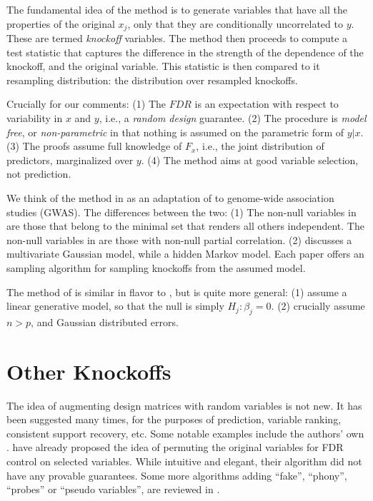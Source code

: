 \documentclass[article,lineno]{biometrika}
\begin{document}
The fundamental idea of the method is to generate variables that have all the properties of the original $x_j$, only that they are conditionally uncorrelated to $y$. 
These are termed \emph{knockoff} variables. 
The method then proceeds to compute a test statistic that captures the difference in the strength of the dependence of the knockoff, and the original variable. 
This statistic is then compared to it resampling distribution: the distribution over resampled knockoffs. 

Crucially for our comments:
(1) The $FDR$ is an expectation with respect to variability in $x$ and $y$, i.e., a \emph{random design} guarantee. 
(2) The procedure is \emph{model free}, or \emph{non-parametric} in that nothing is assumed on the parametric form of $y|x$. 
(3) The proofs assume full knowledge of $F_x$, i.e., the joint distribution of predictors, marginalized over $y$.
(4) The method aims at good variable selection, not prediction. 

We think of the method in \cite{SesiaGenehuntinghidden} as an adaptation of \cite{CandesPanninggoldmodelX2018} to genome-wide association studies (GWAS).
The differences between the two:
(1) The non-null variables in \cite{CandesPanninggoldmodelX2018} are those that belong to the minimal set that renders all others independent. The non-null variables in \cite{SesiaGenehuntinghidden} are those with non-null partial correlation. 
(2) \cite{CandesPanninggoldmodelX2018} discusses a multivariate Gaussian model, while \cite{SesiaGenehuntinghidden} a hidden Markov model. 
Each paper offers an sampling algorithm for sampling knockoffs from the assumed model. 

The method of \cite{SesiaGenehuntinghidden} is similar in flavor to \cite{BarberControllingfalsediscovery2015}, but \cite{SesiaGenehuntinghidden} is quite more general:
(1) \cite{BarberControllingfalsediscovery2015} assume a linear generative model, so that the null is simply $H_j:\beta_j=0$. 
(2) \cite{BarberControllingfalsediscovery2015} crucially assume $n>p$, and Gaussian distributed errors. 




\section{Other Knockoffs}
The idea of augmenting design matrices with random variables is not new. 
It has been suggested many times, for the purposes of prediction, variable ranking, consistent support recovery, etc. 
Some notable examples include the authors' own \cite{candes2006robust}.
\cite{TusherSignificanceanalysismicroarrays2001} have already proposed the idea of permuting the original variables for FDR control on selected variables.
While intuitive and elegant, their algorithm did not have any provable guarantees. 
Some more algorithms adding ``fake'', ``phony'', ``probes'' or ``pseudo variables'', are reviewed in \cite{GuyonIntroductionVariableFeature2003}.
\end{document}
